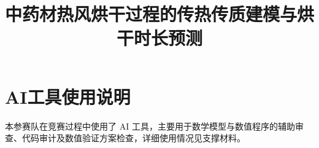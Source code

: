 \documentclass[withoutpreface,bwprint]{cumcmthesis}
\title{中药材热风烘干过程的传热传质建模与烘干时长预测}
\begin{document}

\clearpage







\clearpage
\section*{AI工具使用说明}
本参赛队在竞赛过程中使用了 AI 工具，主要用于数学模型与数值程序的辅助审查、代码审计及数值验证方案检查，详细使用情况见支撑材料。

\end{document}
